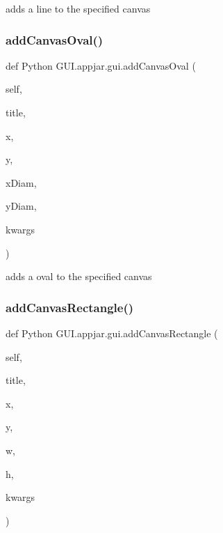 \begin{DoxyVerb}adds a line to the specified canvas \end{DoxyVerb}
 \mbox{\label{class_python_01_g_u_i_1_1appjar_1_1gui_ab505c807c94a07499dbf9768d5902ad8}} 
\subsubsection{\texorpdfstring{add\+Canvas\+Oval()}{addCanvasOval()}}
{\footnotesize\ttfamily def Python G\+U\+I.\+appjar.\+gui.\+add\+Canvas\+Oval (\begin{DoxyParamCaption}\item[{}]{self,  }\item[{}]{title,  }\item[{}]{x,  }\item[{}]{y,  }\item[{}]{x\+Diam,  }\item[{}]{y\+Diam,  }\item[{}]{kwargs }\end{DoxyParamCaption})}

\begin{DoxyVerb}adds a oval to the specified canvas \end{DoxyVerb}
 \mbox{\label{class_python_01_g_u_i_1_1appjar_1_1gui_a554332cd627dffd5029a63f0894752b7}} 
\subsubsection{\texorpdfstring{add\+Canvas\+Rectangle()}{addCanvasRectangle()}}
{\footnotesize\ttfamily def Python G\+U\+I.\+appjar.\+gui.\+add\+Canvas\+Rectangle (\begin{DoxyParamCaption}\item[{}]{self,  }\item[{}]{title,  }\item[{}]{x,  }\item[{}]{y,  }\item[{}]{w,  }\item[{}]{h,  }\item[{}]{kwargs }\end{DoxyParamCaption})}

